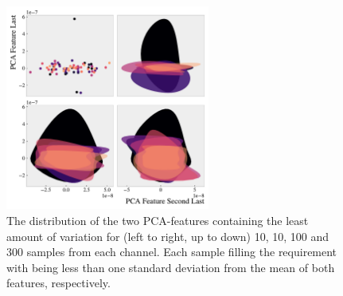 \begin{figure}
    \centering
    \includegraphics[width=0.6\textwidth]{Figures/MLResults/DataHandling/PCA/PCAPlotLast.pdf}
    \caption{The distribution of the two PCA-features containing the least amount of variation for (left to right, 
    up to down) 10, 10, 100 and 300 samples from each channel. Each sample filling the requirement 
    with being less than one standard deviation from the mean of both features, respectively.}
    \label{fig:PCA2}
\end{figure}


